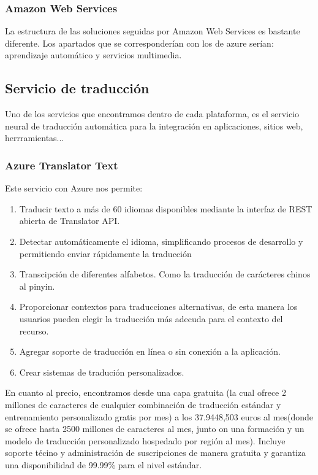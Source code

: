 \documentclass[runningheads]{llncs}
\begin{document}
	\subsubsection{Amazon Web Services}
	La estructura de las soluciones seguidas por Amazon Web Services es bastante diferente. Los apartados que se corresponderían con los de azure serían: aprendizaje automático y servicios multimedia.
	
	
	\subsection{Servicio de traducción}
	Uno de los servicios que encontramos dentro de cada plataforma, es el servicio neural de traducción automática para la integración en aplicaciones, sitios web, herrramientas...
	\subsubsection{Azure Translator Text}
	Este servicio con Azure nos permite:
	\begin{enumerate}
		\item Traducir texto a más de 60 idiomas disponibles mediante la interfaz de REST abierta de Translator API.
		\item Detectar automáticamente el idioma, simplificando procesos de desarrollo y permitiendo enviar rápidamente la traducción
		\item Transcipción de diferentes alfabetos. Como la traducción de carácteres chinos al pinyin.
		\item Proporcionar contextos para traducciones alternativas, de esta manera los usuarios pueden elegir la traducción más adecuda para el contexto del recurso.
		\item Agregar soporte de traducción en línea o sin conexión a la aplicación.
		\item Crear sistemas de tradución personalizados.
	\end{enumerate}{}
	En cuanto al precio, encontramos desde una capa gratuita (la cual ofrece 2 millones de caracteres de cualquier combinación de traducción estándar y entrenamiento personalizado gratis por mes) a los 37.9448,503 euros al mes(donde se ofrece hasta 2500 millones de caracteres al mes, junto on una formación y un modelo de traducción personalizado hospedado por región al mes). Incluye soporte técino y administración de suscripciones de manera gratuita y garantiza una disponibilidad de 99.99\% para el nivel estándar.
	
\end{document}
